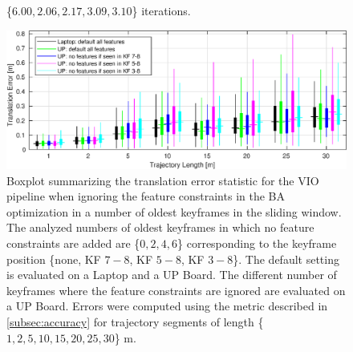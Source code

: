\begin{minipage}[b]{1\linewidth}
\begin{figure}[H]
{\{$6.00, 2.06, 2.17, 3.09, 3.10$\} iterations.}
\label{fig:time_continue_oldest}
\end{figure}
\begin{figure}[H]
\centering
\includegraphics[width=1\textwidth]{images/acc_continue_oldest}
\caption{Boxplot summarizing the translation error statistic for the \ac{VIO}
pipeline when ignoring the feature 
constraints in the \ac{BA} optimization in a number of oldest keyframes in the 
sliding window. The analyzed numbers of oldest keyframes in which no feature 
constraints are added are \{$0, 2, 4, 6$\} corresponding to the keyframe 
position \{none, KF $7\!-\!8$, KF $5\!-\!8$, KF $3\!-\!8$\}. The default 
setting is evaluated on a Laptop and a UP Board. The different number of 
keyframes where the feature constraints are ignored are evaluated on a UP 
Board. Errors were computed using the metric described in 
\autoref{subsec:accuracy} for trajectory segments 
of length \{$1, 2, 5, 10, 15, 20, 25, 30$\} m.}
\label{fig:acc_continue_oldest}
\end{figure}
\end{minipage}


